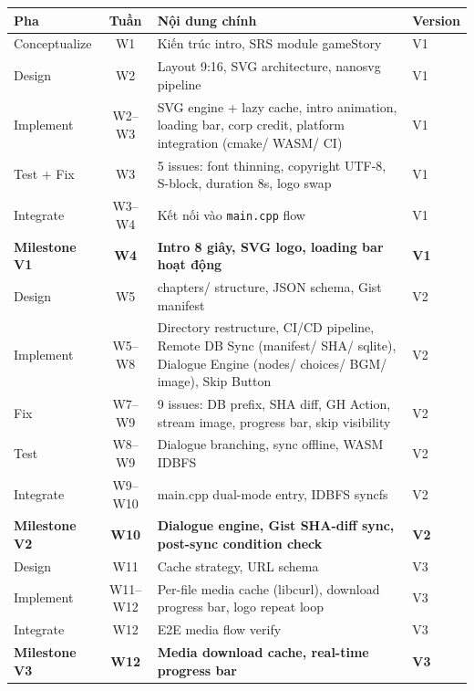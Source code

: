 \documentclass[12pt,a4paper]{article}
\begin{document}
{\small %
\begin{tabularx}{\linewidth}{|l|c|L|l|}
\hline
{}
\textbf{Pha} & \textbf{Tuần} & \textbf{Nội dung chính} & \textbf{Version} \\
\hline
Conceptualize & W1 & Kiến trúc intro, SRS module gameStory & V1 \\
\hline
Design & W2 & Layout 9:16, SVG architecture, nanosvg pipeline & V1 \\
\hline
Implement & W2--W3 & SVG engine + lazy cache, intro animation, loading bar, corp credit, platform integration (cmake/ WASM/ CI) & V1 \\
\hline
Test + Fix & W3 & 5 issues: font thinning, copyright UTF-8, S-block, duration 8s, logo swap & V1 \\
\hline
Integrate & W3--W4 & Kết nối vào \texttt{main.cpp} flow & V1 \\
\hline
{}
\textbf{Milestone V1} & \textbf{W4} & \textbf{Intro 8 giây, SVG logo, loading bar hoạt động} & \textbf{V1} \\
\hline
Design & W5 & chapters/ structure, JSON schema, Gist manifest & V2 \\
\hline
Implement & W5--W8 & Directory restructure, CI/CD pipeline, Remote DB Sync (manifest/ SHA/ sqlite), Dialogue Engine (nodes/ choices/ BGM/ image), Skip Button & V2 \\
\hline
Fix & W7--W9 & 9 issues: DB prefix, SHA diff, GH Action, stream image, progress bar, skip visibility & V2 \\
\hline
Test & W8--W9 & Dialogue branching, sync offline, WASM IDBFS & V2 \\
\hline
Integrate & W9--W10 & main.cpp dual-mode entry, IDBFS syncfs & V2 \\
\hline
{}
\textbf{Milestone V2} & \textbf{W10} & \textbf{Dialogue engine, Gist SHA-diff sync, post-sync condition check} & \textbf{V2} \\
\hline
Design & W11 & Cache strategy, URL schema & V3 \\
\hline
Implement & W11--W12 & Per-file media cache (libcurl), download progress bar, logo repeat loop & V3 \\
\hline
Integrate & W12 & E2E media flow verify & V3 \\
\hline
{}
\textbf{Milestone V3} & \textbf{W12} & \textbf{Media download cache, real-time progress bar} & \textbf{V3} \\
\hline
\end{tabularx}
}
\end{document}
